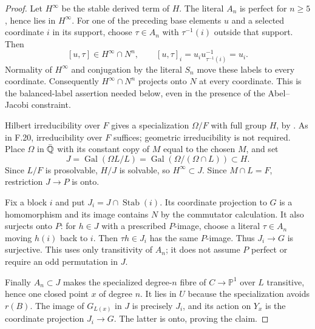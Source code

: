 \begin{proof}
Let $H^\infty$ be the stable derived term of $H$. The literal
$A_n$ is perfect for $n\ge5$, hence lies in $H^\infty$.
For one of the preceding base elements $u$ and a selected
coordinate $i$ in its support, choose $\tau\in A_n$ with
$\tau^{-1}(i)$ outside that support. Then
\[
 [u,\tau]\in H^\infty\cap N^n,\qquad
 [u,\tau]_i=u_i u_{\tau^{-1}(i)}^{-1}=u_i.
\]
Normality of $H^\infty$ and conjugation by the literal $S_n$
move these labels to every coordinate. Consequently
$H^\infty\cap N^n$ projects onto $N$ at every coordinate.
This is the balanced-label assertion needed below, even in the
presence of the Abel--Jacobi constraint.

Hilbert irreducibility over $F$ gives a specialization
$\Omega/F$ with full group $H$, by
\citet[Proposition~3.3.1 and Theorem~3.4.1]{F_Serre2007}.
As in F.20, irreducibility over $F$ suffices; geometric
irreducibility is not required. Place $\Omega$ in $\bar{\mathbb Q}$
with its constant copy of $M$ equal to the chosen $M$, and set
\[
 J=\operatorname{Gal}(\Omega L/L)
   =\operatorname{Gal}(\Omega/(\Omega\cap L))\subset H.
\]
Since $L/F$ is prosolvable, $H/J$ is solvable, so
$H^\infty\subset J$. Since $M\cap L=F$, restriction
$J\to P$ is onto.

Fix a block $i$ and put $J_i=J\cap\operatorname{Stab}(i)$.
Its coordinate projection to $G$ is a homomorphism and its
image contains $N$ by the commutator calculation. It also
surjects onto $P$: for $h\in J$ with a prescribed $P$-image,
choose a literal $\tau\in A_n$ moving $h(i)$ back to $i$.
Then $\tau h\in J_i$ has the same $P$-image. Thus $J_i\to G$
is surjective. This uses only transitivity of $A_n$; it does
not assume $P$ perfect or require an odd permutation in $J$.

Finally $A_n\subset J$ makes the specialized degree-$n$
fibre of $C\to\mathbb P^1$ over $L$ transitive, hence one
closed point $x$ of degree $n$. It lies in $U$ because the
specialization avoids $r(B)$. The image of $G_{L(x)}$ in $J$
is precisely $J_i$, and its action on $Y_x$ is the coordinate
projection $J_i\to G$. The latter is onto, proving the claim.
\end{proof}

